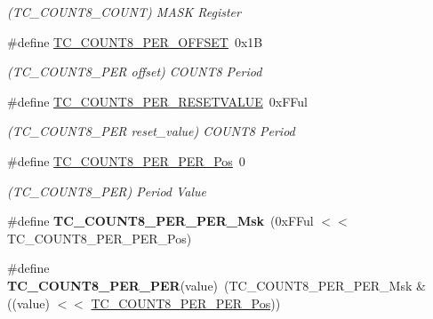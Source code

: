 \begin{DoxyCompactItemize}
\begin{DoxyCompactList}\small\item\em (T\+C\+\_\+\+C\+O\+U\+N\+T8\+\_\+\+C\+O\+U\+N\+T) M\+A\+S\+K Register \end{DoxyCompactList}\item 
\hypertarget{group___s_a_m_l21___t_c_ga549db51b5739e726a7679455842f521a}{}\#define \hyperlink{group___s_a_m_l21___t_c_ga549db51b5739e726a7679455842f521a}{T\+C\+\_\+\+C\+O\+U\+N\+T8\+\_\+\+P\+E\+R\+\_\+\+O\+F\+F\+S\+E\+T}~0x1\+B\label{group___s_a_m_l21___t_c_ga549db51b5739e726a7679455842f521a}

\begin{DoxyCompactList}\small\item\em (T\+C\+\_\+\+C\+O\+U\+N\+T8\+\_\+\+P\+E\+R offset) C\+O\+U\+N\+T8 Period \end{DoxyCompactList}\item 
\hypertarget{group___s_a_m_l21___t_c_gaa7a231774b1eddf2fe959edb8ede80f4}{}\#define \hyperlink{group___s_a_m_l21___t_c_gaa7a231774b1eddf2fe959edb8ede80f4}{T\+C\+\_\+\+C\+O\+U\+N\+T8\+\_\+\+P\+E\+R\+\_\+\+R\+E\+S\+E\+T\+V\+A\+L\+U\+E}~0x\+F\+Ful\label{group___s_a_m_l21___t_c_gaa7a231774b1eddf2fe959edb8ede80f4}

\begin{DoxyCompactList}\small\item\em (T\+C\+\_\+\+C\+O\+U\+N\+T8\+\_\+\+P\+E\+R reset\+\_\+value) C\+O\+U\+N\+T8 Period \end{DoxyCompactList}\item 
\hypertarget{group___s_a_m_l21___t_c_ga5f81942f3b6b97dc3e8b1aaac665ad8f}{}\#define \hyperlink{group___s_a_m_l21___t_c_ga5f81942f3b6b97dc3e8b1aaac665ad8f}{T\+C\+\_\+\+C\+O\+U\+N\+T8\+\_\+\+P\+E\+R\+\_\+\+P\+E\+R\+\_\+\+Pos}~0\label{group___s_a_m_l21___t_c_ga5f81942f3b6b97dc3e8b1aaac665ad8f}

\begin{DoxyCompactList}\small\item\em (T\+C\+\_\+\+C\+O\+U\+N\+T8\+\_\+\+P\+E\+R) Period Value \end{DoxyCompactList}\item 
\hypertarget{group___s_a_m_l21___t_c_gaaefbc4a32c518487019aa2c27d00f5c0}{}\#define {\bfseries T\+C\+\_\+\+C\+O\+U\+N\+T8\+\_\+\+P\+E\+R\+\_\+\+P\+E\+R\+\_\+\+Msk}~(0x\+F\+Ful $<$$<$ T\+C\+\_\+\+C\+O\+U\+N\+T8\+\_\+\+P\+E\+R\+\_\+\+P\+E\+R\+\_\+\+Pos)\label{group___s_a_m_l21___t_c_gaaefbc4a32c518487019aa2c27d00f5c0}

\item 
\hypertarget{group___s_a_m_l21___t_c_ga810fb8465054d6cb972cd72ad20d97f8}{}\#define {\bfseries T\+C\+\_\+\+C\+O\+U\+N\+T8\+\_\+\+P\+E\+R\+\_\+\+P\+E\+R}(value)~(T\+C\+\_\+\+C\+O\+U\+N\+T8\+\_\+\+P\+E\+R\+\_\+\+P\+E\+R\+\_\+\+Msk \& ((value) $<$$<$ \hyperlink{group___s_a_m_l21___t_c_ga5f81942f3b6b97dc3e8b1aaac665ad8f}{T\+C\+\_\+\+C\+O\+U\+N\+T8\+\_\+\+P\+E\+R\+\_\+\+P\+E\+R\+\_\+\+Pos}))\label{group___s_a_m_l21___t_c_ga810fb8465054d6cb972cd72ad20d97f8}


\end{DoxyCompactItemize}
